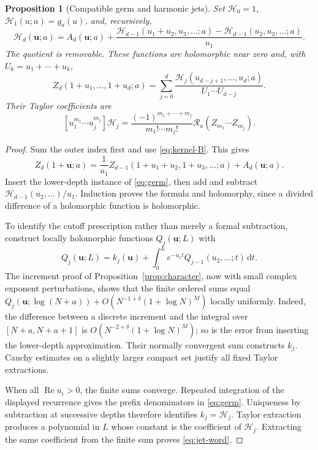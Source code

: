 \documentclass[11pt]{article}
\numberwithin{equation}{section}
\newtheorem{proposition}[theorem]{Proposition}
\theoremstyle{definition}
\newcommand{\R}{\mathcal R}
\newcommand{\HH}{\mathcal H}
\newcommand{\dd}{\,\mathrm d}
\newcommand{\Ree}{\operatorname{Re}}
\newcommand{\bbu}{\boldsymbol u}
\begin{document}
\begin{proposition}[Compatible germ and harmonic jets]\label{prop:germ}
Set $\HH_0=1$, $\HH_1(u;a)=g_a(u)$, and, recursively,
\begin{equation}\label{eq:H-recursion}
 \HH_d(\bbu;a)=A_d(\bbu;a)+
 \frac{\HH_{d-1}(u_1+u_2,u_3,\ldots;a)
       -\HH_{d-1}(u_2,u_3,\ldots;a)}{u_1}.
\end{equation}
The quotient is removable. These functions are holomorphic near zero and,
with $U_k=u_1+\cdots+u_k$,
\begin{equation}\label{eq:germ}
 Z_d(1+u_1,\ldots,1+u_d;a)=
 \sum_{j=0}^d\frac{\HH_j(u_{d-j+1},\ldots,u_d;a)}{U_1\cdots U_{d-j}}.
\end{equation}
Their Taylor coefficients are
\begin{equation}\label{eq:jet-word}
 [u_1^{m_1}\cdots u_j^{m_j}]\HH_j
 =\frac{(-1)^{m_1+\cdots+m_j}}{m_1!\cdots m_j!}
                       \R_a(Z_{m_1}\cdots Z_{m_j}).
\end{equation}
\end{proposition}
\begin{proof}
Sum the outer index first and use \eqref{eq:kernel-B}. This gives
\[
 Z_d(1+\bbu;a)=\frac1{u_1}
 Z_{d-1}(1+u_1+u_2,1+u_3,\ldots;a)+A_d(\bbu;a).
\]
Insert the lower-depth instance of \eqref{eq:germ}, then add and subtract
$\HH_{d-1}(u_2,\ldots)/u_1$. Induction proves the formula and
holomorphy, since a divided difference of a holomorphic function is
holomorphic.

To identify the cutoff prescription rather than merely a formal
subtraction, construct locally holomorphic functions $Q_j(\bbu;L)$ with
\[
 Q_j(\bbu;L)=k_j(\bbu)+\int_0^L e^{-u_1t}
                             Q_{j-1}(u_2,\ldots;t)\dd t.
\]
The increment proof of Proposition~\ref{prop:character}, now with small
complex exponent perturbations, shows that the finite ordered sums equal
$Q_j(\bbu;\log(N+a))+O(N^{-1+\delta}(1+\log N)^M)$ locally uniformly.
Indeed, the difference between a discrete increment and the integral over
$[N+a,N+a+1]$ is $O(N^{-2+\delta}(1+\log N)^M)$; so is the error from
inserting the lower-depth approximation. Their normally convergent sum
constructs $k_j$. Cauchy estimates on a slightly larger compact set justify
all fixed Taylor extractions.

When all $\Ree u_i>0$, the finite sums converge. Repeated integration of
the displayed recurrence gives the prefix denominators in
\eqref{eq:germ}. Uniqueness by subtraction at successive depths therefore
identifies $k_j=\HH_j$. Taylor extraction produces a polynomial in $L$
whose constant is the coefficient of $\HH_j$. Extracting the same
coefficient from the finite sum proves \eqref{eq:jet-word}.
\end{proof}
\end{document}
